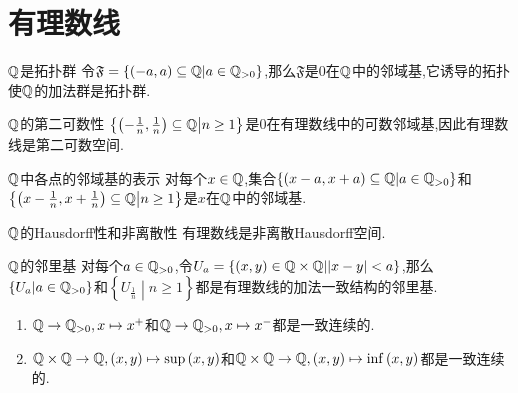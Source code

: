 \section{有理数线}

\begin{proposition}{$\mathbb{Q}$是拓扑群}{}
	令$\mathfrak{F}=\left\{\left(-a,a\right)\subseteq\mathbb{Q}\middle|a\in\mathbb{Q}_{>0}\right\}$,那么$\mathfrak{F}$是$0$在$\mathbb{Q}$中的邻域基,它诱导的拓扑使$\mathbb{Q}$的加法群是拓扑群.
\end{proposition}

\begin{proposition}{$\mathbb{Q}$的第二可数性}{}
	$\left\{\left(-\frac{1}{n},\frac{1}{n}\right)\subseteq\mathbb{Q}\middle|n\geq 1\right\}$是$0$在有理数线中的可数邻域基,因此有理数线是第二可数空间.
\end{proposition}

\begin{corollary}{$\mathbb{Q}$中各点的邻域基的表示}{}
	对每个$x\in\mathbb{Q}$,集合$\left\{\left(x-a,x+a\right)\subseteq\mathbb{Q}\middle|a\in\mathbb{Q}_{>0}\right\}$和$\left\{\left(x-\frac{1}{n},x+\frac{1}{n}\right)\subseteq\mathbb{Q}\middle|n\geq 1\right\}$是$x$在$\mathbb{Q}$中的邻域基.
\end{corollary}

\begin{proposition}{$\mathbb{Q}$的Hausdorff性和非离散性}{}
	有理数线是非离散Hausdorff空间.
\end{proposition}

\begin{proposition}{$\mathbb{Q}$的邻里基}{}
	对每个$a\in\mathbb{Q}_{>0}$,令$U_{a}=\left\{\left(x,y\right)\in\mathbb{Q}\times\mathbb{Q}\middle|\left|x-y\right|<a\right\}$,那么$\left\{U_{a}\middle|a\in\mathbb{Q}_{>0}\right\}$和$\left\{U_{\frac{1}{n}}\middle|n\geq 1\right\}$都是有理数线的加法一致结构的邻里基.
\end{proposition}

\begin{proposition}{}{}
	\begin{enumerate}
		\item $\mathbb{Q}\to\mathbb{Q}_{>0},x\mapsto x^{+}$和$\mathbb{Q}\to\mathbb{Q}_{>0},x\mapsto x^{-}$都是一致连续的.
		\item $\mathbb{Q}\times\mathbb{Q}\to\mathbb{Q},\left(x,y\right)\mapsto\sup\left(x,y\right)$和$\mathbb{Q}\times\mathbb{Q}\to\mathbb{Q},\left(x,y\right)\mapsto\inf\left(x,y\right)$都是一致连续的.
	\end{enumerate}
\end{proposition}